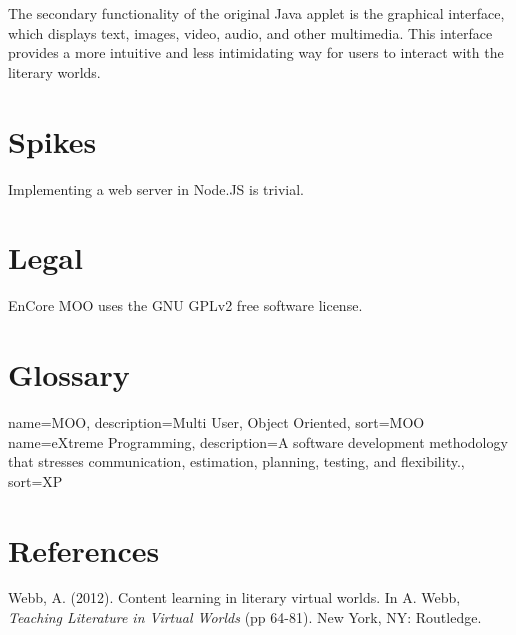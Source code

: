 \documentclass[12pt, letterpaper]{report}
\begin{document}
	\par
	The secondary functionality of the original Java applet is the graphical interface, which displays text, images, video, audio, and other multimedia. This interface provides a more intuitive and less intimidating way for users to interact with the literary worlds. 
	
	\chapter{Spikes}
	\par
	Implementing a web server in Node.JS is trivial.
	
	\chapter{Legal}
	\par
	EnCore MOO uses the GNU GPLv2 free software license.
	
	
	\chapter{Glossary}

		
	{
		name={MOO},
		description={Multi User, Object Oriented},
		sort=MOO
	}
	{
		name={eXtreme Programming},
		description={A software development methodology that stresses communication, estimation, planning, testing, and flexibility.},
		sort=XP
	}

	\glsaddall
	\printglossary
	
	\chapter{References}
	\begin{bibliography}{9}

 	Webb, A. (2012). Content learning in literary virtual worlds.
  	In A. Webb, \emph{Teaching Literature in Virtual Worlds} 
  	(pp 64-81).
  	New York, NY: Routledge.

	\end{bibliography}

	
	
\end{document}
